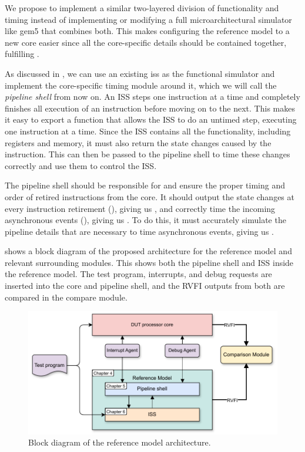 We propose to implement a similar two-layered division of functionality and timing instead of implementing or modifying a full microarchitectural simulator like gem5 \cite{Gem5Simulator2023} that combines both. This makes configuring the reference model to a new core easier since all the core-specific details should be contained together, fulfilling . 


As discussed in , we can use an existing \acrshort{iss} as the functional simulator and implement the core-specific timing module around it, which we will call the \textit{pipeline shell} from now on. An ISS steps one instruction at a time and completely finishes all execution of an instruction before moving on to the next. This makes it easy to export a  function that allows the ISS to do an untimed step, executing one instruction at a time. Since the ISS contains all the functionality, including registers and memory, it must also return the state changes caused by the instruction. This can then be passed to the pipeline shell to time these changes correctly and use them to control the ISS.

The pipeline shell should be responsible for  and ensure the proper timing and order of retired instructions from the core. It should output the state changes at every instruction retirement (), giving us , and correctly time the incoming asynchronous events (), giving us . To do this, it must accurately simulate the pipeline details that are necessary to time asynchronous events, giving us . 

 shows a block diagram of the proposed architecture for the reference model and relevant surrounding modules. This shows both the pipeline shell and ISS inside the reference model. The test program, interrupts, and debug requests are inserted into the core and pipeline shell, and the RVFI outputs from both are compared in the compare module.

\begin{figure}
    \centering
    \includegraphics[width=0.75\linewidth]{figures/Architecture.pdf}
    \caption{Block diagram of the reference model architecture.}
    \label{fig:architecture}
\end{figure}

